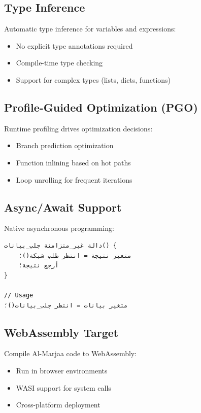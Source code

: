 \documentclass[11pt,a4paper]{article}
\begin{document}
\subsection{Type Inference}

Automatic type inference for variables and expressions:

\begin{itemize}
    \item No explicit type annotations required
    \item Compile-time type checking
    \item Support for complex types (lists, dicts, functions)
\end{itemize}

\subsection{Profile-Guided Optimization (PGO)}

Runtime profiling drives optimization decisions:

\begin{itemize}
    \item Branch prediction optimization
    \item Function inlining based on hot paths
    \item Loop unrolling for frequent iterations
\end{itemize}

\subsection{Async/Await Support}

Native asynchronous programming:

\begin{lstlisting}[language={},title={Async Programming}]
دالة غير_متزامنة جلب_بيانات() {
    متغير نتيجة = انتظر طلب_شبكة()؛
    أرجع نتيجة؛
}

// Usage
متغير بيانات = انتظر جلب_بيانات()؛
\end{lstlisting}

\subsection{WebAssembly Target}

Compile Al-Marjaa code to WebAssembly:

\begin{itemize}
    \item Run in browser environments
    \item WASI support for system calls
    \item Cross-platform deployment
\end{itemize}
\end{document}
